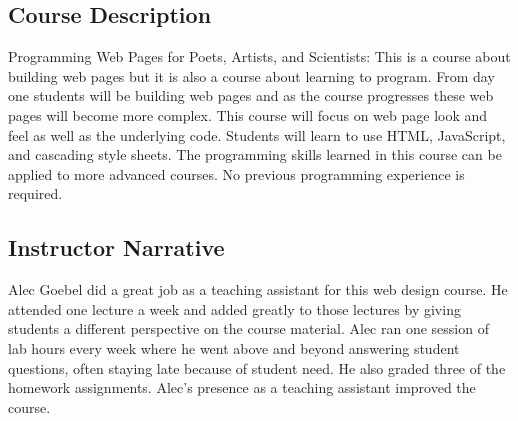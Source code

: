 
\subsection*{Course Description}
Programming Web Pages for Poets, Artists, and Scientists: This is a course
about building web pages but it is also a course about learning to program.
From day one students will be building web pages and as the course progresses
these web pages will become more complex. This course will focus on web page
look and feel as well as the underlying code. Students will learn to use HTML,
JavaScript, and cascading style sheets. The programming skills learned in this
course can be applied to more advanced courses. No previous programming
experience is required.

\subsection*{Instructor Narrative}
Alec Goebel did a great job as a teaching assistant for this web design
course. He attended one lecture a week and added greatly to those
lectures by giving students a different perspective on the course
material. Alec ran one session of lab hours every week where he went
above and beyond answering student questions, often staying late because
of student need. He also graded three of the homework assignments.
Alec's presence as a teaching assistant improved the course.
